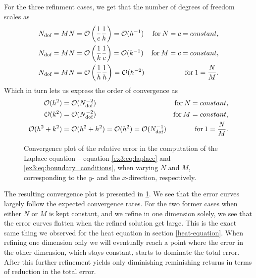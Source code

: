 For the three refinment cases, 
we get that the number of degrees of freedom scales as 
\begin{align*}
    N_{\text{dof}} & = MN = \mathcal{O}\left(\frac{1}{c}\frac{1}{h}\right) = \mathcal{O}(h^{-1}) & \text{for} \: N = c = constant, \\
    N_{\text{dof}} & = MN = \mathcal{O}\left(\frac{1}{k}\frac{1}{c}\right) = \mathcal{O}(k^{-1}) & \text{for} \: M = c = constant, \\
    N_{\text{dof}} & = MN = \mathcal{O}\left(\frac{1}{h}\frac{1}{h}\right) = \mathcal{O}(h^{-2}) & \text{for} \: 1 = \frac{N}{M}.
\end{align*}
Which in turn lets us express the order of convergence as 
\begin{align*}
    \mathcal{O}(h^2) & = \mathcal{O}(N_{\text{dof}}^{-2}) & \text{for} \: N = constant, \\
    \mathcal{O}(k^2) & = \mathcal{O}(N_{\text{dof}}^{-2}) & \text{for} \: M = constant, \\
    \mathcal{O}(h^2 + k^2) & = \mathcal{O}(h^2 + h^2) = \mathcal{O}(h^2) = \mathcal{O}(N_{\text{dof}}^{-1}) & \text{for} \: 1 = \frac{N}{M}.
\end{align*}

\begin{figure}[tbp]
    \centering
    
    \caption{Convergence plot of the relative error in the computation of the Laplace equation -- equation \eqref{ex3:eq:laplace} and \eqref{ex3:eq:boundary_conditions}, when varying $N$ and $M$, corresponding to the $y$- and the $x$-direction, respectively.}
    \label{ex3:fig:convergence_plot}
\end{figure}

The resulting convergence plot is presented in \ref{ex3:fig:convergence_plot}. 
We see that the error curves largely follow the expected convergence rates. 
For the two former cases when either $N$ or $M$ is kept constant, 
and we refine in one dimension solely, 
we see that the error curves flatten when the refined solution get large. 
This is the exact same thing we observed for the heat equation in section \ref{heat-equation}. 
When refining one dimension only we will eventually reach a point where the error in the other dimension, 
which stays constant, 
starts to dominate the total error. 
After this further refinement yields only diminishing reminishing returns in terms of reduction in the total error. 
